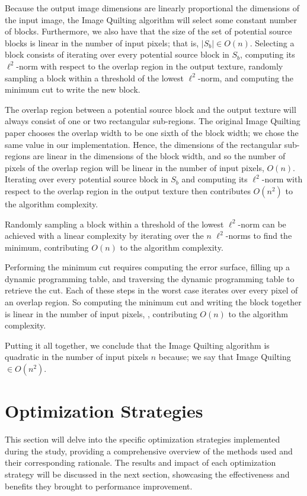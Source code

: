 \documentclass[letterpaper]{article}
\begin{document}
Because the output image dimensions are linearly proportional the dimensions of the input image, the Image Quilting algorithm will select some constant number of blocks. Furthermore, we also have that the size of the set of potential source blocks is linear in the number of input pixels; that is, $|S_b| \in O(n)$. Selecting a block consists of iterating over every potential source block in $S_b$, computing its $\ell ^2$-norm with respect to the overlap region in the output texture, randomly sampling a block within a threshold of the lowest $\ell ^2$-norm, and computing the minimum cut to write the new block.

The overlap region between a potential source block and the output texture will always consist of one or two rectangular sub-regions. The original Image Quilting paper chooses the overlap width to be one sixth of the block width; we chose the same value in our implementation. Hence, the dimensions of the rectangular sub-regions are linear in the dimensions of the block width, and so the number of pixels of the overlap region will be linear in the number of input pixels, $O(n)$. Iterating over every potential source block in $S_b$ and computing its $\ell ^2$-norm with respect to the overlap region in the output texture then contributes $O(n^2)$ to the algorithm complexity.

Randomly sampling a block within a threshold of the lowest $\ell ^2$-norm can be achieved with a linear complexity by iterating over the $n$ $\ell ^2$-norms to find the minimum, contributing $O(n)$ to the algorithm complexity.

Performing the minimum cut requires computing the error surface, filling up a dynamic programming table, and traversing the dynamic programming table to retrieve the cut. Each of these steps in the worst case iterates over every pixel of an overlap region. So computing the minimum cut and writing the block together is linear in the number of input pixels, , contributing $O(n)$ to the algorithm complexity.

Putting it all together, we conclude that the Image Quilting algorithm is quadratic in the number of input pixels $n$ because; we say that Image Quilting $ \in O(n^2)$.

\section{Optimization Strategies}\label{sec:yourmethod}

 This section will delve into the specific optimization strategies implemented during the study, providing a comprehensive overview of the methods used and their corresponding rationale. The results and impact of each optimization strategy will be discussed in the next section, showcasing the effectiveness and benefits they brought to performance improvement.
\end{document}
